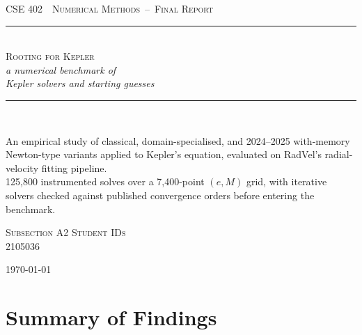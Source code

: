 \documentclass[11pt,a4paper]{article}
\begin{document}

\begin{titlepage}
\pagecolor{Paper}
\thispagestyle{empty}
\begin{center}
  \vspace*{1.6cm}
  {\color{Accent}\scshape\large CSE 402 \,\textbar\, Numerical Methods\, --\, Final Report}\\[0.6cm]
  {\color{Rule}\rule{0.55\textwidth}{0.8pt}}\\[1.1cm]

  {\color{Ink}\scshape\Huge Rooting for Kepler}\\[0.35cm]
  {\color{Muted}\Large\itshape a numerical benchmark of\\[2pt] Kepler solvers and starting guesses}\\[1.4cm]

  {\color{Rule}\rule{0.32\textwidth}{0.6pt}}\\[1.1cm]

  \begin{minipage}{0.76\textwidth}
    \centering
    \small\color{Muted}
    An empirical study of classical, domain-specialised, and 2024--2025
    with-memory Newton-type variants applied to Kepler's equation,
    evaluated on RadVel's radial-velocity fitting pipeline.\\[0.7em]
    \normalcolor\color{Ink}
    125{,}800 instrumented solves over a 7{,}400-point $(e,M)$ grid,
    with iterative solvers checked against published convergence orders
    before entering the benchmark.
  \end{minipage}

  \vspace{2.0cm}
  {\scshape\color{Accent}\footnotesize Subsection A2 \quad\textbar\quad Student IDs}\\[0.35cm]
  {\color{Ink}2105036    }

  \vfill
  {\footnotesize\color{Muted}\today}
\end{center}
\end{titlepage}


\section*{Summary of Findings}
\end{document}

